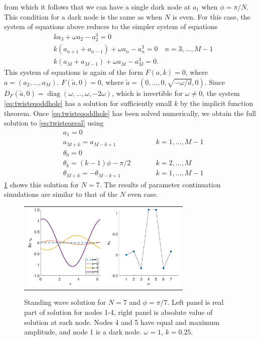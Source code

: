 \documentclass[reprint, amsmath,amssymb,aps]{revtex4-2}
\DeclareMathOperator{\diag}{diag}
\begin{document}
from which it follows that we can have a single dark node at $a_1$ when $\phi = \pi/N$. This condition for a dark node is the same as when $N$ is even. For this case, the system of equations above reduces to the simpler system of equations
\begin{equation}\label{eq:twisteqoddhole}
\begin{aligned}
& k a_3 + \omega a_2 - a_2^3 = 0\\
&k( a_{n+1} + a_{n-1} ) + \omega a_n - a_n^3 = 0 \quad n = 3, \dots, M-1 \\
&k ( a_M + a_{M-1} ) + \omega a_M - a_M^3 = 0.
\end{aligned}
\end{equation}
This system of equations is again of the form $F(a,k) = 0$, where $a = (a_2, \dots, a_M)$. $F(\tilde{a}, 0) = 0$, where $\tilde{a} = (0, \dots, 0, \sqrt{-\omega/d}, 0)$. Since $D_F(\tilde{a}, 0) = \diag(\omega, \dots, \omega, -2\omega)$, which is invertible for $\omega \neq 0$, the system \cref{eq:twisteqoddhole} has a solution for sufficiently small $k$ by the implicit function theorem. Once \cref{eq:twisteqoddhole} has been solved numerically, we obtain the full solution to \cref{eq:twisteqreal} using
\begin{align*}
&a_1 = 0 \\
&a_{M+k} = a_{M-k+1} && \qquad k = 1, \dots, M-1 \\
&\theta_0 = 0 \\
&\theta_k = (k-1)\phi - \pi/2 && \qquad k = 2, \dots, M \\
&\theta_{M+k} = -\theta_{M-k+1} && \qquad k = 1, \dots, M-1
\end{align*}
\cref{fig:oddhole7} shows this solution for $N=7$. The results of parameter continuation simulations are similar to that of the $N$ even case.
\begin{figure}
\begin{center}
\begin{tabular}{c}
\includegraphics[width=8cm]{images/oddhole7.eps}
\end{tabular}
\end{center}
\caption{Standing wave solution for $N = 7$ and $\phi = \pi/7$. Left panel is real part of solution for nodes 1-4, right panel is absolute value of solution at each node. Nodes 4 and 5 have equal and maximum amplitude, and node 1 is a dark node. $\omega = 1$, $k = 0.25$.}
\label{fig:oddhole7}
\end{figure}
\end{document}

